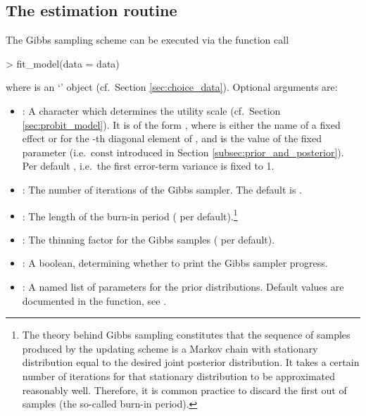 \documentclass[article,shortnames]{jss}
\newcommand{\class}[1]{`\code{#1}'}
\newcommand{\fct}[1]{\code{#1()}}
\begin{document}
\subsection{The estimation routine} \label{subsec:estimation_routine}

The Gibbs sampling scheme can be executed via the function call

\begin{Schunk}
\begin{Sinput}
> fit_model(data = data)
\end{Sinput}
\end{Schunk}

where  is an \class{RprobitB\_data} object (cf.\ Section \ref{sec:choice_data}). Optional arguments are:

\begin{itemize}
  \item {}: A character which determines the utility scale (cf.\ Section \ref{sec:probit_model}). It is of the form , where  is either the name of a fixed effect or  for the -th diagonal element of , and  is the value of the fixed parameter (i.e.\ $\text{const}$ introduced in Section \ref{subsec:prior_and_posterior}). Per default , i.e.\ the first error-term variance is fixed to 1.
  \item {}: The number of iterations of the Gibbs sampler. The default is .
  \item {}: The length of the burn-in period ( per default).\footnote{The theory behind Gibbs sampling constitutes that the sequence of samples produced by the
updating scheme is a Markov chain with stationary distribution equal to the desired joint posterior distribution. It takes a certain number of iterations for that stationary distribution to be approximated reasonably well. Therefore, it is common practice to discard the first  out of  samples (the so-called burn-in period).}
  \item {}: The thinning factor for the Gibbs samples ( per default).
  \item {}: A boolean, determining whether to print the Gibbs sampler progress.
  \item {}: A named list of parameters for the prior distributions. Default values are documented in the \fct{check\_prior} function, see .
\end{itemize}
\end{document}
